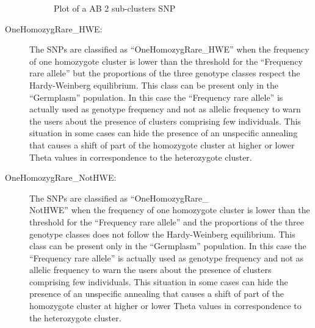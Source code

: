 \documentclass[a4paper,11pt,english]{article}
\begin{document}
\begin{description}
\begin{figure}[H]
\caption{Plot of a AB 2 sub-clusters SNP}\end{figure}

\item [OneHomozygRare\_HWE:] The SNPs are classified as ``OneHomozygRare\_HWE'' when the frequency
of one homozygote cluster is lower than the threshold for the ``Frequency rare allele''
but the proportions of the three genotype classes respect the Hardy-Weinberg equilibrium. This class
can be present only in the ``Germplasm'' population. In this case the ``Frequency rare allele'' is
actually used as genotype frequency and not as allelic frequency to warn the users about the
presence of clusters comprising few individuals. This situation in some cases can hide the presence
of an unspecific annealing that causes a shift of part of the homozygote cluster at higher or
lower Theta values in correspondence to the heterozygote cluster.

\item [OneHomozygRare\_NotHWE:] The SNPs are classified as ``OneHomozygRare\_\\NotHWE'' when the
frequency of one homozygote cluster is lower than the threshold for the ``Frequency rare
allele'' and the proportions of the three genotype classes does not follow the Hardy-Weinberg
equilibrium. This class can be present only
in the ``Germplasm'' population. In this case the ``Frequency rare allele'' is
actually used as genotype frequency and not as allelic frequency to warn the users about the
presence of clusters comprising few individuals. This situation in some cases can hide the presence
of an unspecific annealing that causes a shift of part of the homozygote cluster at higher or
lower Theta values in correspondence to the heterozygote cluster.

\begin{figure}[H]
\centering
\capstart


\end{figure}
\end{description}
\end{document}
